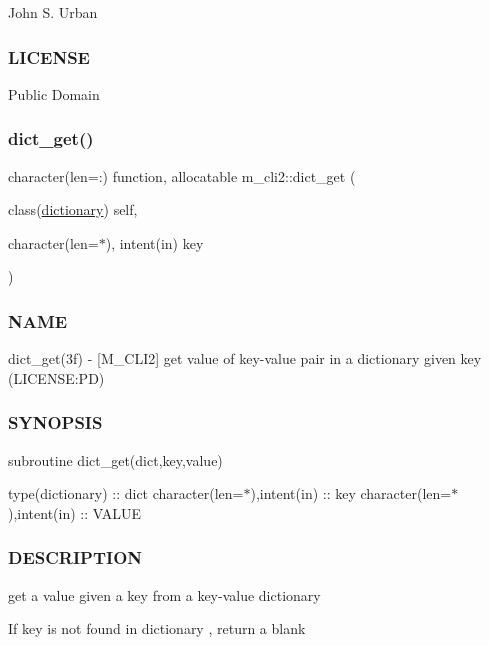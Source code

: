 John S. Urban \subsubsection*{L\+I\+C\+E\+N\+SE}

Public Domain \mbox{\label{namespacem__cli2_a5b489c992f1434fa27e7858a483a38c7}} 
\subsubsection{\texorpdfstring{dict\+\_\+get()}{dict\_get()}}
{\footnotesize\ttfamily character(len=\+:) function, allocatable m\+\_\+cli2\+::dict\+\_\+get (\begin{DoxyParamCaption}\item[{class(\mbox{\hyperlink{structm__cli2_1_1dictionary}{dictionary}})}]{self,  }\item[{character(len=$\ast$), intent(in)}]{key }\end{DoxyParamCaption})\hspace{0.3cm}{\ttfamily [private]}}



\subsubsection*{N\+A\+ME}

dict\+\_\+get(3f) -\/ \mbox{[}M\+\_\+\+C\+L\+I2\mbox{]} get value of key-\/value pair in a dictionary given key (L\+I\+C\+E\+N\+SE\+:PD) 

\subsubsection*{S\+Y\+N\+O\+P\+S\+IS}

subroutine dict\+\_\+get(dict,key,value)

type(dictionary) \+:\+: dict character(len=$\ast$),intent(in) \+:\+: key character(len=$\ast$),intent(in) \+:\+: V\+A\+L\+UE

\subsubsection*{D\+E\+S\+C\+R\+I\+P\+T\+I\+ON}

\begin{DoxyVerb}get a value given a key from a key-value dictionary

If key is not found in dictionary , return a blank
\end{DoxyVerb}


